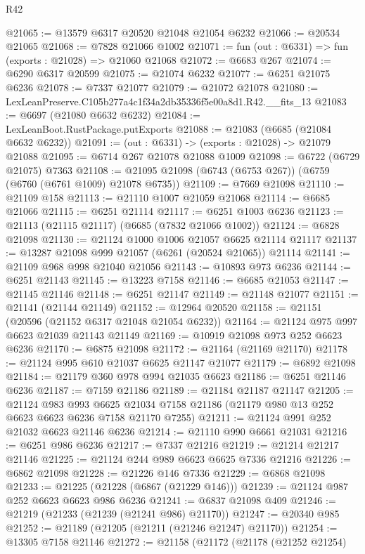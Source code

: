 \begin{lexlean}{R42}
\begin{coremodule}
{@21065 := @13579 @6317 @20520 @21048 @21054 @6232
@21066 := @20534 @21065
@21068 := @7828 @21066 @1002
@21071 := fun (out : @6331) => fun (exports : @21028) => @21060 @21068
@21072 := @6683 @267
@21074 := @6290 @6317 @20599
@21075 := @21074 @6232
@21077 := @6251 @21075 @6236
@21078 := @7337 @21077
@21079 := @21072 @21078
@21080 := LexLeanPreserve.C105b277a4c1f34a2db35336f5e00a8d1.R42.__fits_13
@21083 := @6697 (@21080 @6632 @6232)
@21084 := LexLeanBoot.RustPackage.putExports
@21088 := @21083 (@6685 (@21084 @6632 @6232))
@21091 := (out : @6331) -> (exports : @21028) -> @21079 @21088
@21095 := @6714 @267 @21078 @21088 @1009
@21098 := @6722 (@6729 @21075) @7363
@21108 := @21095 @21098 (@6743 (@6753 @267)) (@6759 (@6760 (@6761 @1009) @21078 @6735))
@21109 := @7669 @21098
@21110 := @21109 @158
@21113 := @21110 @1007 @21059 @21068
@21114 := @6685 @21066
@21115 := @6251 @21114
@21117 := @6251 @1003 @6236
@21123 := @21113 (@21115 @21117) (@6685 (@7832 @21066 @1002))
@21124 := @6828 @21098
@21130 := @21124 @1000 @1006 @21057 @6625 @21114 @21117
@21137 := @13287 @21098 @999 @21057 (@6261 (@20524 @21065)) @21114
@21141 := @21109 @968 @998 @21040 @21056
@21143 := @10893 @973 @6236
@21144 := @6251 @21143
@21145 := @13223 @7158
@21146 := @6685 @21053
@21147 := @21145 @21146
@21148 := @6251 @21147
@21149 := @21148 @21077
@21151 := @21141 (@21144 @21149)
@21152 := @12964 @20520
@21158 := @21151 (@20596 (@21152 @6317 @21048 @21054 @6232))
@21164 := @21124 @975 @997 @6623 @21039 @21143 @21149
@21169 := @10919 @21098 @973 @252 @6623 @6236
@21170 := @6875 @21098
@21172 := @21164 (@21169 @21170)
@21178 := @21124 @995 @610 @21037 @6625 @21147 @21077
@21179 := @6892 @21098
@21184 := @21179 @360 @978 @994 @21035 @6623
@21186 := @6251 @21146 @6236
@21187 := @7159 @21186
@21189 := @21184 @21187 @21147
@21205 := @21124
    @983
    @993
    @6625
    @21034
    @7158
    @21186
    (@21179 @980 @13 @252 @6623 @6623 @6236 @7158 @21170 @7255)
@21211 := @21124 @991 @252 @21032 @6623 @21146 @6236
@21214 := @21110 @990 @6661 @21031
@21216 := @6251 @986 @6236
@21217 := @7337 @21216
@21219 := @21214 @21217 @21146
@21225 := @21124 @244 @989 @6623 @6625 @7336 @21216
@21226 := @6862 @21098
@21228 := @21226 @146 @7336
@21229 := @6868 @21098
@21233 := @21225 (@21228 (@6867 (@21229 @146)))
@21239 := @21124 @987 @252 @6623 @6623 @986 @6236
@21241 := @6837 @21098 @409
@21246 := @21219 (@21233 (@21239 (@21241 @986) @21170))
@21247 := @20340 @985
@21252 := @21189 (@21205 (@21211 (@21246 @21247) @21170))
@21254 := @13305 @7158 @21146
@21272 := @21158
    (@21172
      (@21178
        (@21252 @21254)
}
\end{coremodule}
\end{lexlean}
